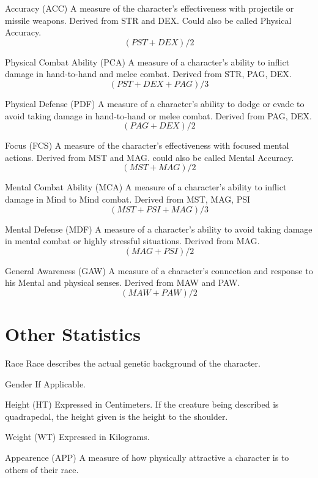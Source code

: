 \begin{relate}
	\item[Accuracy (ACC)]
	A measure of the character's effectiveness with projectile or missile
	weapons. Derived from STR and DEX. Could also be called Physical
	Accuracy.
	\[(PST+DEX)/2		  \]
	\item[Physical Combat Ability (PCA)]
	A measure of a character's ability to in\-flict 
	dam\-age in hand-to-hand and melee combat. Derived from 
	STR, PAG, DEX.
	\[(PST+DEX+PAG)/3 \]
	\item[Physical Defense (PDF)]
	A measure of a character's ability to dodge or evade  to avoid
	taking damage in hand-to-hand or melee combat. Derived 
	from PAG, DEX.
	\[(PAG+DEX)/2 \]
	\item[Focus	(FCS)]
	A measure of the character's effectiveness with focused mental
	actions. Derived from MST and MAG. could also be called Mental
	Accuracy.
	\[(MST+MAG)/2 \]
	\item[Mental Combat Ability (MCA)]
	A measure of a character's ability to inflict damage in Mind to Mind
	combat. Derived from MST, MAG, PSI
	\[(MST+PSI+MAG)/3 \]
	\item[Mental Defense (MDF)]
	A measure of a character's ability to avoid taking damage in mental
	combat or highly stressful situations. Derived from MAG.
	\[(MAG+PSI)/2 \]
	\item[General Awareness (GAW)]
	A measure of a character's connection and response to his Mental and
	physical senses. Derived from MAW and PAW.
	\[(MAW+PAW)/2 \]
\end{relate}

\normalsize
\onecolumn



\clearpage
\section{Other Statistics}
\begin{relate}
	\item[Race]
	Race describes the actual genetic background of the character. 
	\item[Gender]
	If Applicable.
	\item[Height (HT)]
	Expressed in Centimeters. If the creature being described is
	quadrapedal, the height given is the height to the shoulder.
	\item[Weight (WT)]
	Expressed in Kilograms.
	\item[Appearence	(APP)]
	A measure of how physically attractive a character is 
	to others of their race.
\end{relate}


